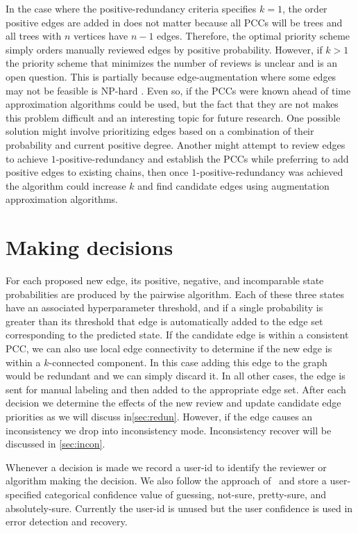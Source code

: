 In the case where the positive-redundancy criteria specifies $k=1$, the order positive edges are added in does not
matter because all PCCs will be trees and all trees with $n$ vertices have $n-1$ edges. Therefore, the optimal
priority scheme simply orders manually reviewed edges by positive probability. However, if $k>1$ the priority
scheme that minimizes the number of reviews is unclear and is an open question. This is partially because
edge-augmentation where some edges may not be feasible is NP-hard \cite{khuller_approximation_1993}. Even so, if
the PCCs were known ahead of time approximation algorithms could be used, but the fact that they are not makes this
problem difficult and an interesting topic for future research. One possible solution might involve prioritizing
edges based on a combination of their probability and current positive degree. Another might attempt to review
edges to achieve $1$-positive-redundancy and establish the PCCs while preferring to add positive edges to existing
chains, then once $1$-positive-redundancy was achieved the algorithm could increase $k$ and find candidate edges
using augmentation approximation algorithms.

\section{Making decisions}\label{sec:decision}

For each proposed new edge, its positive, negative, and incomparable state probabilities are produced by the
pairwise algorithm. Each of these three states have an associated hyperparameter threshold, and if a single
probability is greater than its threshold that edge is automatically added to the edge set corresponding to the
predicted state. If the candidate edge is within a consistent PCC, we can also use local edge connectivity to
determine if the new edge is within a $k$-connected component. In this case adding this edge to the graph would be
redundant and we can simply discard it. In all other cases, the edge is sent for manual labeling and then added to
the appropriate edge set. After each decision we determine the effects of the new review and update candidate edge
priorities as we will discuss in\cref{sec:redun}. However, if the edge causes an inconsistency we drop into
inconsistency mode. Inconsistency recover will be discussed in \cref{sec:incon}.

Whenever a decision is made we record a user-id to identify the reviewer or algorithm making the decision. We also
follow the approach of~\cite{branson_visual_2010} and store a user-specified categorical confidence value of
guessing, not-sure, pretty-sure, and absolutely-sure. Currently the user-id is unused but the user confidence is
used in error detection and recovery.


